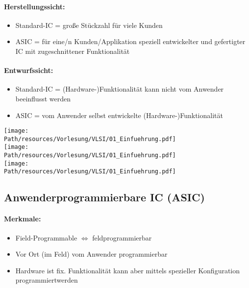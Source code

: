 	\paragraph{Herstellungssicht:}
	\begin{itemize}
		\item Standard-IC = große Stückzahl für viele Kunden
		\item ASIC = für eine/n Kunden/Applikation speziell entwickelter und gefertigter IC mit zugeschnittener Funktionalität
	\end{itemize}

	\paragraph{Entwurfssicht:}
	\begin{itemize}
		\item Standard-IC = (Hardware-)Funktionalität kann nicht vom Anwender beeinflusst werden
		\item ASIC = vom Anwender selbst entwickelte (Hardware-)Funktionalität
	\end{itemize}

	\newpage
	\begin{center}
	\texttt{[image: \\Path/resources/Vorlesung/VLSI/01\_Einfuehrung.pdf]}
	\\\texttt{[image: \\Path/resources/Vorlesung/VLSI/01\_Einfuehrung.pdf]}
	\\\texttt{[image: \\Path/resources/Vorlesung/VLSI/01\_Einfuehrung.pdf]}
	\end{center}

\subsection{Anwenderprogrammierbare IC (ASIC)}
	\paragraph{Merkmale:}
	\begin{itemize}
		\item Field-Programmable $\Leftrightarrow$ feldprogrammierbar
		\item Vor Ort (im Feld) vom Anwender programmierbar
		\item Hardware ist fix. Funktionalität kann aber mittels spezieller Konfiguration \grqq programmiert\grqq werden
	\end{itemize}
